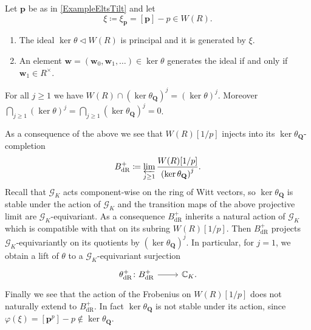 \begin{prop}
	Let $\mathbf{p}$ be as in \cref{ExampleEltsTilt} and let
	\begin{equation*}
		\xi \coloneqq \xi_{\mathbf{p}} = [\mathbf{p}] - p \in W(R)
	.\end{equation*}
\begin{enumerate}
	\item The ideal $\ker \theta \triangleleft W(R)$ is principal and it is generated
		by $\xi$.
	\item An element $\mathbf{w} = (\mathbf{w}_0, \mathbf{w}_1, \ldots) \in \ker\theta$ generates
		the ideal if and only if $\mathbf{w}_1 \in R^{\times}$.
\end{enumerate}
\end{prop}


\begin{cor}
	For all $j \geq 1$ we have $W(R) \cap \left( \ker \theta_{\mathbf{Q}} \right)^j =
	\left( \ker \theta \right)^j$.
	Moreover $\bigcap_{j \geq 1} \left( \ker \theta \right)^j =
	\bigcap_{j \geq 1} \left( \ker \theta_{\mathbf{Q}} \right)^j = 0$.
\end{cor} 


\begin{rem}[]\label{kerQGKStable}
	As a consequence of the above we see that $W(R)[1/p]$
	injects into its $\ker \theta_{\mathbf{Q}}$-completion
	\begin{equation*}
	B^+_{\mathrm{dR}} \coloneqq \varprojlim_{j \geq 1}
	\frac{ W(R)[1/p] }{ \left( \ker \theta_{\mathbf{Q}} \right)^j }
	.\end{equation*}
	Recall that $\mathscr{G}_K$ acts component-wise on the ring of Witt vectors,
	so $\ker \theta_{\mathbf{Q}}$ is stable under the action of $\mathscr{G}_K$
	and the transition maps of the above projective limit are $\mathscr{G}_K$-equivariant.
	As a consequence $B^+_{\mathrm{dR}}$ inherits a natural action of $\mathscr{G}_K$
	which is compatible with that on its subring $W(R)[1/p]$.
	Then $B^+_{\mathrm{dR}}$ projects $\mathscr{G}_K$-equivariantly on its quotients
	by $\left( \ker \theta_{\mathbf{Q}} \right)^j$.
	In particular, for $j = 1$, we obtain a lift of $\theta$ 
	to a $\mathscr{G}_K$-equivariant surjection
	\begin{equation*}
	\begin{tikzcd}[row sep = 0ex
		,/tikz/column 1/.append style={anchor=base east}
		,/tikz/column 2/.append style={anchor=base west}]
		\theta^+_{\mathrm{dR}}\colon B^+_{\mathrm{dR}} \arrow[r, "", rightarrow] &
		\mathbb{C}_K
	.\end{tikzcd}
	\end{equation*} 
	Finally we see that the action of the Frobenius on $W(R)[1/p]$
	does not naturally extend to $B^+_{\mathrm{dR}}$.
	In fact $\ker \theta_{\mathbf{Q}}$ is not stable under its action,
	since $\varphi(\xi) = [\mathbf{p}^p] - p \notin \ker \theta_{\mathbf{Q}}$.
\end{rem}


